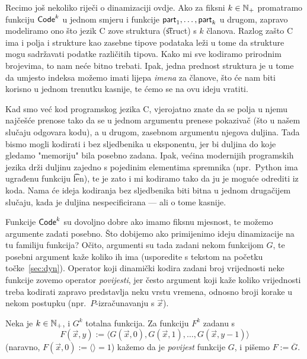 \begin{napomena}
Recimo još nekoliko riječi o dinamizaciji ovdje. Ako za fiksni $k\in{\mathbb N}_+$ promatramo funkciju $\mathsf{Code}^k$ u jednom smjeru i funkcije $\mathsf{part}_1,\dotsc,\mathsf{part}_k$ u drugom, zapravo modeliramo ono što jezik C zove struktura (\t{struct}) s $k$ članova. Razlog zašto C ima i polja i strukture kao zasebne tipove podataka leži u tome da strukture mogu sadržavati podatke različitih tipova. Kako mi sve kodiramo prirodnim brojevima, to nam neće bitno trebati. Ipak, jedna prednost struktura je u tome da umjesto indeksa možemo imati lijepa \emph{imena} za članove, što će nam biti korisno u jednom trenutku kasnije, te ćemo se na ovu ideju vratiti.
\end{napomena}

Kad smo već kod programskog jezika C, vjerojatno znate da se polja u njemu najčešće prenose tako da se u jednom argumentu prenese pokazivač (što u našem slučaju odgovara kodu), a u drugom, zasebnom argumentu njegova duljina. Tada bismo mogli kodirati i bez sljedbenika u eksponentu, jer bi duljina do koje gledamo "memoriju" bila posebno zadana. Ipak, većina modernijih programskih jezika drži duljinu zajedno s pojedinim elementima spremnika (npr.\ Python ima ugrađenu funkciju \t{len}), te je zato i mi kodiramo tako da ju je moguće odrediti iz koda. Nama će ideja kodiranja bez sljedbenika biti bitna u jednom drugačijem slučaju, kada je duljina nespecificirana --- ali o tome kasnije.

Funkcije $\mathsf{Code}^k$ su dovoljno dobre ako imamo fiksnu mjesnost, te možemo argumente zadati posebno. Što dobijemo ako primijenimo ideju dinamizacije na tu familiju funkcija? Očito, argumenti su tada zadani nekom funkcijom $G$, te posebni argument kaže koliko ih ima (usporedite s tekstom na početku točke~\ref{sec:dyn}). Operator koji dinamički kodira zadani broj vrijednosti neke funkcije zovemo operator \emph{povijesti}, jer često argument koji kaže koliko vrijednosti treba kodirati zapravo predstavlja neku vrstu vremena, odnosno broji korake u nekom postupku (npr.\ $P$-izračunavanju s $\vec x$).

\begin{definicija}
Neka je $k\in{\mathbb N}_+$, i $G^k$ totalna funkcija. Za funkciju $F^k$ zadanu s
\begin{equation}\label{eq:povijest}
    F(\vec x,y):=\langle G(\vec x,0),G(\vec x,1),\dotsc,G(\vec x,y-1)\rangle
\end{equation}
(naravno, $F(\vec x,0):=\langle\rangle=1$) kažemo da je \emph{povijest} funkcije $G$, i pišemo $F:=\overline G$.
\end{definicija}

